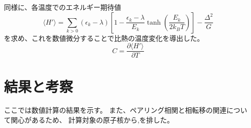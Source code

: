 \documentclass[a4paper,11pt]{jsreport}
\begin{document}
  同様に、各温度でのエネルギー期待値  
  \begin{equation}
      \langle H' \rangle = \sum_{k>0} (\epsilon_k - \lambda) \left[ 1 - \frac{\epsilon_k - \lambda}{E_k} \tanh \left( \frac{E_k}{2k_B T} \right) \right] - \frac{\Delta^2}{G}
  \end{equation}
  を求め、これを数値微分することで比熱の温度変化を導出した。  
  \begin{equation}
      C = \frac{\partial \langle H' \rangle}{\partial T}
  \end{equation}

\chapter{結果と考察}
  ここでは数値計算の結果を示す。
  また、ペアリング相関と相転移の関連について関心があるため、
  計算対象の原子核から,を排した。
\end{document}
